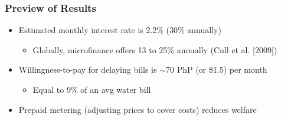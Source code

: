 \documentclass[aspectratio=149]{beamer}
\begin{document}
\begin{frame}
\frametitle{Preview of Results}

\begin{itemize}
  \item Estimated monthly interest rate is 2.2\%  (30\% annually)
  \vspace{1mm}
    \begin{itemize}
      \item Globally, microfinance offers 13 to 25\% annually { \footnotesize (Cull et al. [2009])}
    \end{itemize}

\vspace{2mm}

  \item Willingness-to-pay for delaying bills is $\sim$70 PhP (or \$1.5) per month 
  \vspace{1mm}
  \begin{itemize}
    \item Equal to 9\% of an avg water bill
  \end{itemize}

\vspace{2mm}

  \item Prepaid metering (adjusting prices to cover costs) reduces welfare

\end{itemize}

\end{frame}


\end{document}
